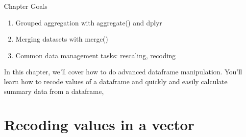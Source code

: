 \documentclass{tufte-book}\usepackage[]{graphicx}\usepackage[]{color}
\begin{document}
\begin{footnotesize}
Chapter Goals

\begin{enumerate}
  \item Grouped aggregation with aggregate() and dplyr
  \item Merging datasets with merge()
  \item Common data management tasks: rescaling, recoding
\end{enumerate}


In this chapter, we'll cover how to do advanced dataframe manipulation. You'll learn how to recode values of a dataframe and quickly and easily calculate summary data from a dataframe, 


\section{Recoding values in a vector}




\end{footnotesize}
\end{document}

